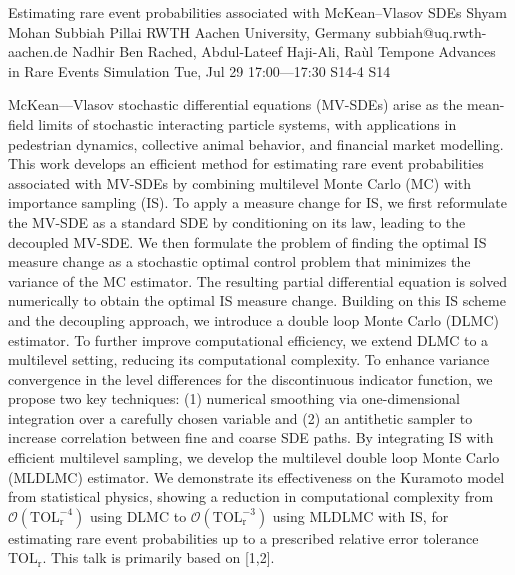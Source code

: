 \begin{talk}
  {Estimating rare event probabilities associated with McKean--Vlasov SDEs}%
  {Shyam Mohan Subbiah Pillai}%
  {RWTH Aachen University, Germany}%
  {subbiah@uq.rwth-aachen.de}%
  {Nadhir Ben Rached, Abdul-Lateef Haji-Ali, Ra\`ul Tempone}%
  {Advances in Rare Events Simulation}%
  {Tue, Jul 29 17:00---17:30}%
  {S14-4}%
  {S14}%
    
   
McKean---Vlasov stochastic differential equations (MV-SDEs) arise as the mean-field limits of stochastic interacting particle systems, with applications in pedestrian dynamics, collective animal behavior, and financial market modelling. This work develops an efficient method for estimating rare event probabilities associated with MV-SDEs by combining multilevel Monte Carlo (MC) with importance sampling (IS). To apply a measure change for IS, we first reformulate the MV-SDE as a standard SDE by conditioning on its law, leading to the decoupled MV-SDE. We then formulate the problem of finding the optimal IS measure change as a stochastic optimal control problem that minimizes the variance of the MC estimator. The resulting partial differential equation is solved numerically to obtain the optimal IS measure change. Building on this IS scheme and the decoupling approach, we introduce a double loop Monte Carlo (DLMC) estimator. To further improve computational efficiency, we extend DLMC to a multilevel setting, reducing its computational complexity. To enhance variance convergence in the level differences for the discontinuous indicator function, we propose two key techniques: (1) numerical smoothing via one-dimensional integration over a carefully chosen variable and (2) an antithetic sampler to increase correlation between fine and coarse SDE paths. By integrating IS with efficient multilevel sampling, we develop the multilevel double loop Monte Carlo (MLDLMC) estimator. We demonstrate its effectiveness on the Kuramoto model from statistical physics, showing a reduction in computational complexity from $\mathcal{O}(\mathrm{TOL}_\mathrm{r}^{-4})$ using DLMC to $\mathcal{O}(\mathrm{TOL}_\mathrm{r}^{-3})$ using MLDLMC with IS, for estimating rare event probabilities up to a prescribed relative error tolerance $\mathrm{TOL}_\mathrm{r}$. This talk is primarily based on [1,2].

\medskip


\end{talk}
